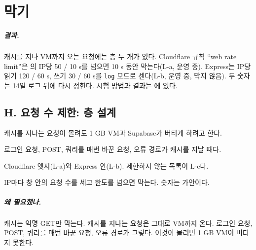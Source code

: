 \chapter{막기}\label{ch:blocking}

\paragraph{결과.}
캐시를 지나 VM까지 오는 요청에는 층 두 개가 있다.
Cloudflare 규칙 ``web rate limit''은 의 IP당 50 / 10 s를 넘으면 10 s 동안 막는다(L-a, 운영 중).
Express는 IP당 읽기 120 / 60 s, 쓰기 30 / 60 s를 \texttt{log} 모드로 센다(L-b, 운영 중, 막지 않음).
두 숫자는 14일 로그 뒤에 다시 정한다.
시험 방법과 결과는 에 있다.

\section{H. 요청 수 제한: 층 설계}\label{sec:bl-design}

\begin{inbrief}
  \item[Why] 캐시를 지나는 요청이 몰려도 1 GB VM과 Supabase가 버티게 하려고 한다.
  \item[When] 로그인 요청, POST, 쿼리를 매번 바꾼 요청, 오류 경로가 캐시를 지날 때다.
  \item[Where] Cloudflare 엣지(L-a)와 Express 안(L-b). 제한하지 않는 목록이 L-c다.
  \item[How] IP마다 창 안의 요청 수를 세고 한도를 넘으면 막는다. 숫자는 가안이다.
\end{inbrief}

\paragraph{왜 필요했나.}
캐시는 익명 GET만 막는다.
캐시를 지나는 요청은 그대로 VM까지 온다.
로그인 요청, POST, 쿼리를 매번 바꾼 요청, 오류 경로가 그렇다.
이것이 몰리면 1 GB VM이 버티지 못한다.

